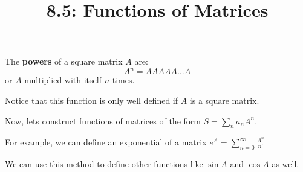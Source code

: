 \documentclass{article}
\title{8.5: Functions of Matrices}
\begin{document}
\maketitle
\begin{definition}
The \textbf{powers} of a square matrix $A$ are:
$$A^n = AAAAA...A$$or $A$ multiplied with itself $n$ times.
\end{definition}
Notice that this function is only well defined if $A$ is a square matrix.

Now, lets construct functions of matrices of the form $S = \sum_{n}a_n A^n$.

For example, we can define an exponential of a matrix $e^{A} = \sum_{n=0}^{\infty} \frac{A^n}{n!}$

We can use this method to define other functions like $\sin{A}$ and $\cos{A}$ as well. 
\end{document}
